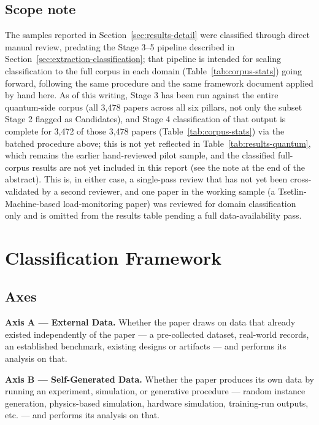 \documentclass[11pt]{article}
\begin{document}
\subsection{Scope note}
The samples reported in Section~\ref{sec:results-detail} were classified through direct
manual review, predating the Stage 3--5 pipeline described in
Section~\ref{sec:extraction-classification}; that pipeline is intended for scaling
classification to the full corpus in each domain (Table~\ref{tab:corpus-stats}) going
forward, following the same procedure and the same framework document applied by hand
here. As of this writing, Stage 3 has been run against the entire quantum-side corpus
(all 3{,}478 papers across all six pillars, not only the subset Stage 2 flagged as
Candidates), and Stage 4 classification of that output is complete for 3{,}472 of
those 3{,}478 papers (Table~\ref{tab:corpus-stats}) via the batched procedure above;
this is not yet reflected in Table~\ref{tab:results-quantum}, which remains the
earlier hand-reviewed pilot sample, and the classified full-corpus results are not yet
included in this report (see the note at the end of the abstract). This is, in either case, a single-pass
review that has not yet been
cross-validated by a second reviewer, and one paper in the working sample (a
Tsetlin-Machine-based load-monitoring paper) was reviewed for domain classification only
and is omitted from the results table pending a full data-availability pass.

\section{Classification Framework}
\label{sec:framework}

\subsection{Axes}

\textbf{Axis A --- External Data.} Whether the paper draws on data that already existed
independently of the paper --- a pre-collected dataset, real-world records, an
established benchmark, existing designs or artifacts --- and performs its analysis on
that.

\textbf{Axis B --- Self-Generated Data.} Whether the paper produces its own data by
running an experiment, simulation, or generative procedure --- random instance
generation, physics-based simulation, hardware simulation, training-run outputs, etc.
--- and performs its analysis on that.
\end{document}
